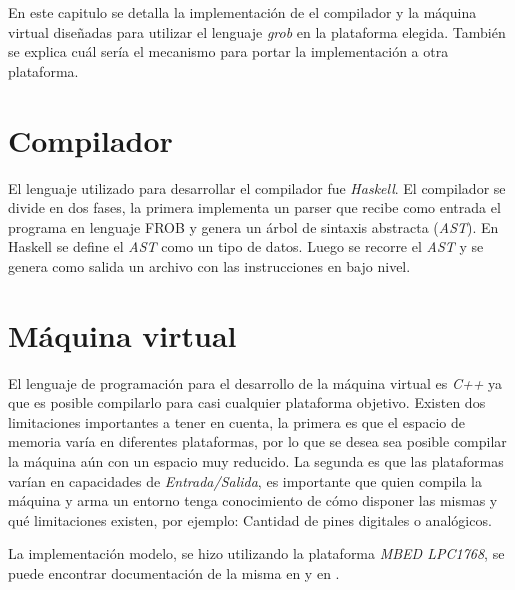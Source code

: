 
En este capitulo se detalla la implementación de el compilador
y la máquina virtual diseñadas para utilizar el lenguaje
\emph{grob} en la plataforma elegida.
También se explica cuál sería el mecanismo para portar la
implementación a otra plataforma.



\section{Compilador}

  El lenguaje utilizado para desarrollar el compilador fue \textit{Haskell}.
El compilador se divide en dos fases, la primera implementa un
parser que recibe como entrada el programa en lenguaje {FROB} y genera un árbol de sintaxis abstracta (\emph{AST}). En Haskell
se define el \emph{AST} como un tipo de datos.
  Luego se recorre el \emph{AST} y se genera como salida un archivo
con las instrucciones en bajo nivel.

\section{Máquina virtual}

  El lenguaje de programación para el desarrollo de la máquina virtual
es \textit{C++} ya que es posible compilarlo para casi cualquier plataforma
objetivo.
  Existen dos limitaciones importantes a tener en cuenta, la primera es que
el espacio de memoria varía en diferentes plataformas, por lo que se desea
sea posible compilar la máquina aún con un espacio muy reducido.
  La segunda es que las plataformas varían en capacidades
de \textit{Entrada/Salida}, es importante que quien compila la máquina y
arma un entorno tenga conocimiento de cómo disponer las mismas y qué
limitaciones existen, por ejemplo: Cantidad de pines digitales o analógicos.

  La implementación modelo, se hizo utilizando la plataforma \textit{MBED LPC1768},
se puede encontrar documentación de la misma en \cite{mbed-LPC1768} 
y en \cite{mbed}.

